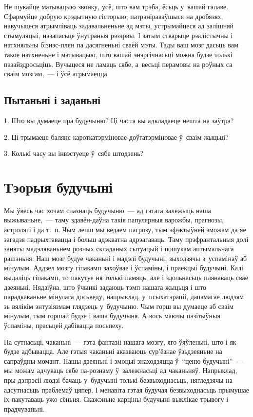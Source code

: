 Не шукайце матывацыю звонку, усё, што вам трэба, ёсьць у~вашай галаве. Сфармуйце добрую крэдытную гісторыю, патрэніраваўшыся на дробязях, навучыцеся атрымліваць задавальненьне ад мэты, устрымайцеся ад залішняй стымуляцыі, назапасьце ўнутраныя рэзэрвы. І затым стварыце рэалістычны і натхняльны бізнэс-плян па дасягненьні сваёй мэты. Тады ваш мозг дасьць вам такое натхненьне і матывацыю, што вашай энэргічнасьці можна будзе толькі пазайздросьціць. Вучыцеся не ламаць сябе, а~весьці перамовы на роўных са сваім мозгам,~--- і ўсё атрымаецца.

\subsection*{Пытаньні і заданьні}

1. Што вы думаеце пра будучыню? Ці часта вы адкладаеце нешта на заўтра?

2. Ці трымаеце балянс кароткатэрміновае-доўгатэрміновае ў~сваім жыцьці?

3. Колькі часу вы інвэстуеце ў~сябе штодзень?


\section{Тэорыя будучыні}

Мы ўвесь час хочам спазнаць будучыню~--- ад гэтага залежыць наша выжываньне,~--- таму здавён-даўна такія папулярныя варожбы, прагнозы, астролягі і да т.~п. Чым лепш мы ведаем пагрозу, тым эфэктыўней зможам да яе загадзя падрыхтавацца і больш адэкватна адрэагаваць. Таму прэфрантальныя долі заняты мадэляваньнем розных складаных сытуацый і пошукам аптымальнага рашэньня. Наш мозг будуе чаканьні і мадэлі будучыні, зыходзячы з~успамінаў аб мінулым. Аддзел мозгу гіпакамп захоўвае і ўспаміны, і праекцыі будучыні. Калі выдаліць гіпакамп, то пакутуе ня толькі памяць, але і здольнасьць плянаваць свае дзеяньні. Нядзіўна, што ўчынкі задаюць тэмп нашага жыцьця і што парадкаваньне мінулага досьведу, напрыклад, у~псыхатэрапіі, дапамагае людзям зь вялікім энтузіязмам глядзець у~будучыню. Чым горш вы думаеце аб сваім мінулым, тым горшай будзе і ваша будучыня. А вось маючы пазітыўныя ўспаміны, прасьцей дабівацца посьпеху.

Па сутнасьці, чаканьні~--- гэта фантазіі нашага мозгу, яго ўяўленьні, што і як будзе адбывацца. Але гэтыя чаканьні аказваюць сур'ёзнае ўзьдзеяньне на сапраўдны момант. Нашы дзеяньні і эмоцыі знаходзяцца ў~``ценю будучыні''~--- мы можам адчуваць сябе па-рознаму ў~залежнасьці ад чаканьняў. Напрыклад, пры дэпрэсіі людзі бачаць у~будучыні толькі безвыходнасьць, нягледзячы на адсутнасьць праблемаў цяпер. І менавіта гэтая будучая безвыходнасьць прымушае іх пакутаваць ужо сёньня. Скажэньне карціны будучыні выклікае трывогу і прадчуваньні.

